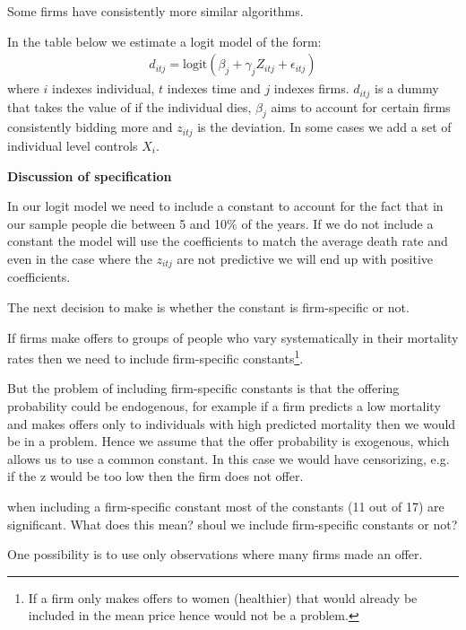 \documentclass[12pt]{article}
\begin{document}
Some firms have consistently more similar algorithms. 


In the table below we estimate a logit model of the form: 
\begin{align}
    d_{itj} = \text{logit}(\beta_j + \gamma_j Z_{itj} + \epsilon_{itj})
\end{align}
where $i$ indexes individual, $t$ indexes time and $j$ indexes firms. 
$d_{itj}$ is a dummy that takes the value of if the individual dies, $\beta_j$ aims to account for certain firms consistently bidding more and $z_{itj}$ is the deviation. In some cases we add a set of individual level controls $X_i$. 
 


\textbf{Discussion of specification}


In our logit model we need to include a constant to account for the fact that in our sample people die between 5 and 10\% of the years. If we do not include a constant the model will use the coefficients to match the average death rate and even in the case where the $z_{itj}$ are not predictive we will end up with positive coefficients. 

The next decision to make is whether the constant is firm-specific or not. 

If firms make offers to groups of people who vary systematically in their mortality rates then we need to include firm-specific constants\footnote{If a firm only makes offers to women (healthier) that would already be included in the mean price hence would not be a problem.}.


But the problem of including firm-specific constants is that the offering probability could be endogenous, for example if a firm predicts a low mortality and makes offers only to individuals with high predicted mortality then we would be in a problem. Hence we assume that the offer probability is exogenous, which allows us to use a common constant. In this case we would have censorizing, e.g. if the z would be too low then the firm does not offer. 





when including a firm-specific constant most of the constants (11 out of 17) are significant. What does this mean? shoul we include firm-specific constants or not?

One possibility is to use only observations where many firms made an offer. 
\end{document}
